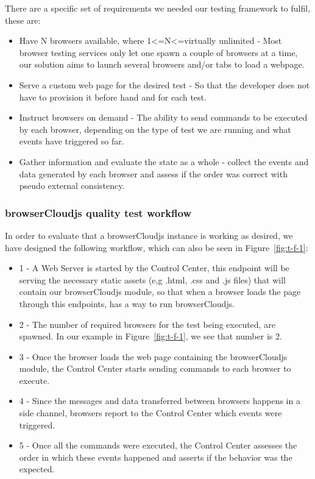 There are a specific set of requirements we needed our testing framework to fulfil, these are:

\begin{itemize}
    \item Have N browsers available, where 1\textless=N\textless=virtually unlimited - Most browser testing services only let one spawn a couple of browsers at a time, our solution aims to launch several browsers and/or tabs to load a webpage.
    \item Serve a custom web page for the desired test - So that the developer does not have to provision it before hand and for each test.
    \item Instruct browsers on demand - The ability to send commands to be executed by each browser, depending on the type of test we are running and what events have triggered so far.
    \item Gather information and evaluate the state as a whole - collect the events and data generated by each browser and assess if the order was correct with pseudo external consistency.
\end{itemize}

\subsubsection{browserCloudjs quality test workflow}

In order to evaluate that a browserCloudjs instance is working as desired, we have designed the following workflow, which can also be seen in Figure~\ref{fig:t-f-1}:

\begin{itemize}
    \item 1 - A Web Server is started by the Control Center, this endpoint will be serving the necessary static assets (e,g .html, .css and .js files) that will contain our browserCloudjs module, so that when a browser loads the page through this endpoints, has a way to run browserCloudjs.
    \item 2 - The number of required browsers for the test being executed, are spawned. In our example in Figure~\ref{fig:t-f-1}, we see that number is 2.
    \item 3 - Once the browser loads the web page containing the browserCloudjs module, the Control Center starts sending commands to each browser to execute.
    \item 4 - Since the messages and data transferred between browsers happens in a side channel, browsers report to the Control Center which events were triggered.
    \item 5 - Once all the commands were executed, the Control Center assesses the order in which these events happened and asserts if the behavior was the expected.
\end{itemize}

